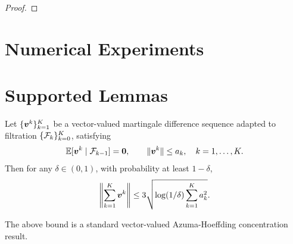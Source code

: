 \documentclass[10pt]{article}
\begin{document}
\begin{proof}
\end{proof}

\section{Numerical Experiments}
\label{sec:experiments}

\appendix
\section{Supported Lemmas}
\label{sec:appendix-supported}

\begin{lemma}
\label{lem:vector-azuma}
Let $\{\bm{v}^k\}_{k=1}^K$ be a vector-valued martingale difference
sequence adapted to filtration $\{\mathcal{F}_k\}_{k=0}^K$, satisfying
\begin{equation}
    \mathbb{E}[\bm{v}^k \mid \mathcal{F}_{k-1}] = \bm{0},
    \qquad
    \|\bm{v}^k\| \leq a_k,\quad k=1,\ldots,K.
\end{equation}
Then for any $\delta \in (0,1)$, with probability at least $1-\delta$,
\begin{equation}
    \left\|\sum_{k=1}^{K}\bm{v}^k\right\|
    \leq
    3\sqrt{\log(1/\delta)\sum_{k=1}^{K}a_k^2}.
\end{equation}
\end{lemma}

\noindent
The above bound is a standard vector-valued Azuma-Hoeffding concentration result.

\clearpage
\small


\end{document}
